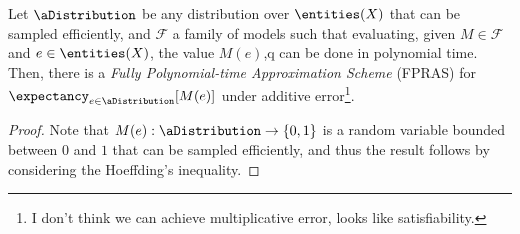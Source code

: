 \begin{proposition}
    Let $\aDistribution$ be any distribution over $\entities(X)$ that can be sampled efficiently, and $\mathcal{F}$ a family of models such that evaluating, given $M \in \mathcal{F}$ and $e \in \entities(X)$, the value $M(e)$,q can be done in polynomial time. Then, there is a \textit{Fully Polynomial-time Approximation Scheme} (FPRAS) for $\expectancy_{e \in \aDistribution}[M(e)]$ under additive error\footnote{I don't think we can achieve multiplicative error, looks like satisfiability.}.
\end{proposition}

\begin{proof}
    Note that $M(e) : \aDistribution \to \{0,1\}$ is a random variable bounded between $0$ and $1$ that can be sampled efficiently, and thus the result follows by considering the Hoeffding's inequality.
\end{proof}


